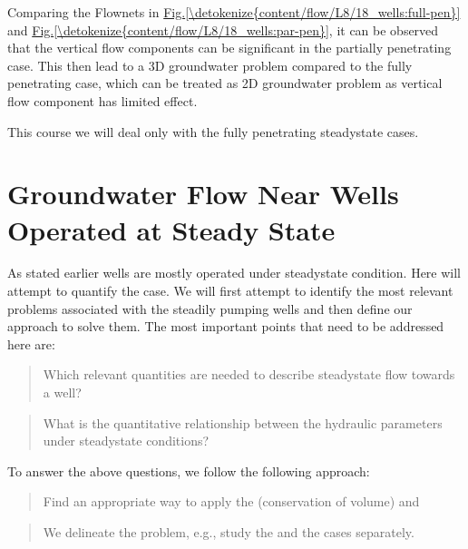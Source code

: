 \documentclass[letterpaper,10pt,english]{jupyterBook}
\begin{document}
\sphinxAtStartPar
Comparing the Flownets in \hyperref[\detokenize{content/flow/L8/18_wells:full-pen}]{Fig.\@ \ref{\detokenize{content/flow/L8/18_wells:full-pen}}} and \hyperref[\detokenize{content/flow/L8/18_wells:par-pen}]{Fig.\@ \ref{\detokenize{content/flow/L8/18_wells:par-pen}}}, it can be observed that the vertical flow components can be significant in the partially penetrating case. This then lead to a 3D groundwater problem compared to the fully penetrating case, which can be treated as 2D groundwater problem as vertical flow component has limited effect.

\sphinxAtStartPar
This course we will deal only with the fully penetrating steady\sphinxhyphen{}state cases.


\section{Groundwater Flow Near Wells Operated at Steady State}
\label{\detokenize{content/flow/L8/18_wells:groundwater-flow-near-wells-operated-at-steady-state}}
\sphinxAtStartPar
As stated earlier wells are mostly operated under steady\sphinxhyphen{}state condition. Here will attempt to quantify the case. We will first attempt to identify the most relevant problems associated with the steadily pumping wells and then define our approach to solve them. The  most important points that need to be addressed here  are:
\begin{quote}

\sphinxAtStartPar
Which relevant quantities are needed to describe steady\sphinxhyphen{}state flow
towards a well?
\end{quote}
\begin{quote}

\sphinxAtStartPar
What is the quantitative relationship between the hydraulic
parameters under steady\sphinxhyphen{}state conditions?
\end{quote}

\sphinxAtStartPar
To answer the above questions, we follow the following approach:
\begin{quote}

\sphinxAtStartPar
Find an appropriate way to apply the 
(conservation of volume) and 
\end{quote}
\begin{quote}

\sphinxAtStartPar
We delineate the problem, e.g., study the  and the  cases separately.
\end{quote}
\end{document}
